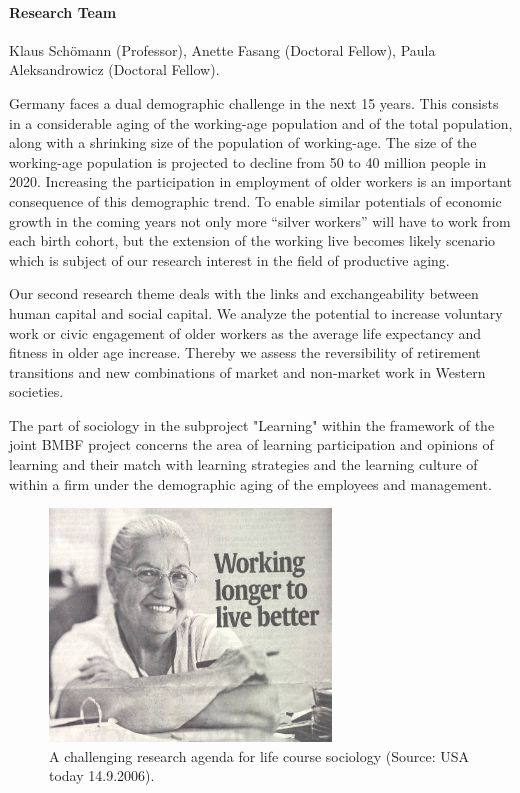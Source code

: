 

\paragraph{Research Team}
Klaus Sch\"omann (Professor), Anette Fasang (Doctoral Fellow), Paula Aleksandrowicz (Doctoral Fellow).

Germany faces a dual demographic challenge in the next 15 years. This consists in a considerable aging of the working-age population and of the total population, along with a shrinking size of the population of working-age. The size of the working-age population is projected to decline from 50 to 40 million people in 2020. Increasing the participation in employment of older workers is an important consequence of this demographic trend. To enable similar potentials of economic growth in the coming years not only more ``silver workers'' will have to work from each birth cohort, but the extension of the working live becomes likely scenario which is subject of our research interest in the field of productive aging. 

 Our second research theme deals with the links and exchangeability between human capital and social capital. We analyze the potential to increase voluntary work or civic engagement of older workers as the average life expectancy and fitness in older age increase. Thereby we assess the reversibility of retirement transitions and new combinations of market and non-market work in Western societies. 

 The part of sociology in the subproject "Learning" within the framework of the joint BMBF project concerns the area of learning participation and opinions of learning and their match with learning strategies and the learning culture of within a firm under the demographic aging of the employees and management. 

\begin{figure}[h]
  \begin{center}
    \includegraphics[width=7.5cm]{profKlausSchoemann-fig2.jpg}
    \caption{A challenging research agenda for life course sociology (Source: USA today 14.9.2006).}\label{fig2:profKlausSchoemann}
   \end{center}
\end{figure}

